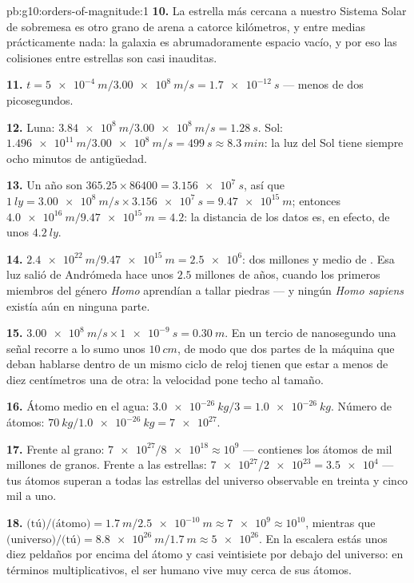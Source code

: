 \begin{solution}{pb:g10:orders-of-magnitude:1}
\textbf{10.} La estrella más cercana a nuestro Sistema Solar de sobremesa
es otro grano de arena a catorce kilómetros, y entre medias
prácticamente nada: la galaxia es abrumadoramente espacio vacío, y por
eso las colisiones entre estrellas son casi inauditas.

\textbf{11.} $t = \qty{5e-4}{m}/\qty{3.00e8}{m/s} = \qty{1.7e-12}{s}$
--- menos de dos picosegundos.

\textbf{12.} Luna: $\qty{3.84e8}{m}/\qty{3.00e8}{m/s} =
\qty{1.28}{s}$. Sol: $\qty{1.496e11}{m}/\qty{3.00e8}{m/s} =
\qty{499}{s} \approx \qty{8.3}{min}$: la luz del Sol tiene siempre ocho
minutos de antigüedad.

\textbf{13.} Un año son $365.25 \times 86400 = \qty{3.156e7}{s}$, así
que $\qty{1}{ly} = \qty{3.00e8}{m/s} \times \qty{3.156e7}{s}
= \qty{9.47e15}{m}$; entonces
$\qty{4.0e16}{m}/\qty{9.47e15}{m} = 4.2$: la distancia de los datos es,
en efecto, de unos $\qty{4.2}{ly}$.

\textbf{14.} $\qty{2.4e22}{m}/\qty{9.47e15}{m} = \num{2.5e6}$: dos
millones y medio de . Esa luz salió de Andrómeda hace unos $2.5$
millones de años, cuando los primeros miembros del género \emph{Homo}
aprendían a tallar piedras --- y ningún \emph{Homo sapiens} existía aún
en ninguna parte.

\textbf{15.} $\qty{3.00e8}{m/s} \times \qty{1e-9}{s} = \qty{0.30}{m}$.
En un tercio de nanosegundo una señal recorre a lo sumo unos
$\qty{10}{cm}$, de modo que dos partes de la máquina que deban hablarse
dentro de un mismo ciclo de reloj tienen que estar a menos de diez
centímetros una de otra: la velocidad pone techo al tamaño.

\textbf{16.} Átomo medio en el agua:
$\qty{3.0e-26}{kg}/3 = \qty{1.0e-26}{kg}$. Número de átomos:
$\qty{70}{kg}/\qty{1.0e-26}{kg} = \num{7e27}$.

\textbf{17.} Frente al grano:
$\num{7e27}/\num{8e18} \approx 10^{9}$ --- contienes los átomos de mil
millones de granos. Frente a las estrellas:
$\num{7e27}/\num{2e23} = \num{3.5e4}$ --- tus átomos superan a todas las
estrellas del universo observable en treinta y cinco mil a uno.

\textbf{18.} $\text{(tú)}/\text{(átomo)} =
\qty{1.7}{m}/\qty{2.5e-10}{m} \approx \num{7e9} \approx 10^{10}$,
mientras que $\text{(universo)}/\text{(tú)} =
\qty{8.8e26}{m}/\qty{1.7}{m} \approx \num{5e26}$. En la escalera estás
unos diez peldaños por encima del átomo y casi veintisiete por debajo
del universo: en términos multiplicativos, el ser humano vive muy cerca
de sus átomos.


\end{solution}
